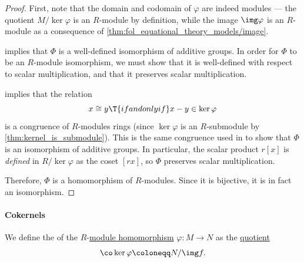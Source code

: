 \begin{proof}
  First, note that the domain and codomain of \( \varphi \) are indeed modules --- the quotient \( M / \ker \varphi \) is an \( R \)-module by definition, while the image \( \img \varphi \) is an \( R \)-module as a consequence of \cref{thm:fol_equational_theory_models/image}.

   implies that \( \Phi \) is a well-defined isomorphism of additive groups. In order for \( \Phi \) to be an \( R \)-module isomorphism, we must show that it is well-defined with respect to scalar multiplication, and that it preserves scalar multiplication.

   implies that the relation
  \begin{equation*}
    x \cong y \T{if and only if} x - y \in \ker \varphi
  \end{equation*}
  is a congruence of \( R \)-modules rings (since \( \ker \varphi \) is an \( R \)-submodule by \cref{thm:kernel_is_submodule}). This is the same congruence used in  to show that \( \Phi \) is an isomorphism of additive groups. In particular, the scalar product \( r[x] \) is \emph{defined} in \( R / \ker \varphi \) as the coset \( [rx] \), so \( \Phi \) preserves scalar multiplication.

  Therefore, \( \Phi \) is a homomorphism of \( R \)-modules. Since it is bijective, it is in fact an isomorphism.
\end{proof}

\paragraph{Cokernels}

\begin{definition}\label{def:module_cokernel}
  We define the  of the \( R \)-\hyperref[def:module/morphism]{module homomorphism} \( \varphi: M \to N \) as the \hyperref[def:module/quotient]{quotient}
  \begin{equation*}
    \co\ker \varphi \coloneqq N / \img f.
  \end{equation*}
\end{definition}

